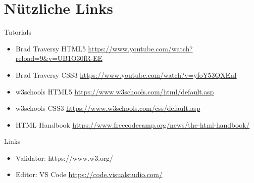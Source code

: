 \documentclass[12pt,xcolor={rgb}]{beamer}
\begin{document}
\section{Nützliche Links}

\begin{frame}{Tutorials}
\begin{itemize}
\item Brad Traversy HTML5 \url{https://www.youtube.com/watch?reload=9&v=UB1O30fR-EE}
\item Brad Traversy CSS3 \url{https://www.youtube.com/watch?v=yfoY53QXEnI}
\item w3schools HTML5 \url{https://www.w3schools.com/html/default.asp}
\item w3schools CSS3 \url{https://www.w3schools.com/css/default.asp}
\item HTML Handbook \url{https://www.freecodecamp.org/news/the-html-handbook/}
\end{itemize}
\end{frame}


\begin{frame}{Links}
\begin{itemize}
\item Validator: https://www.w3.org/
\item Editor: VS Code \url{https://code.visualstudio.com/}
\end{itemize}
\end{frame}
\end{document}
